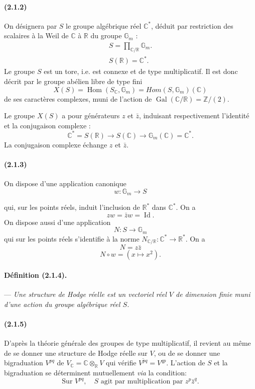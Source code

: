 \documentclass[10pt]{article}
\newcommand{\C}{\mathbb C}
\newcommand{\Z}{\mathbb Z}
\newcommand{\Hom}{\operatorname{Hom}}
\newcommand{\R}{\mathbb R}
\newcommand{\Gm}{\mathbb G_m}
\newcommand{\Gal}{\operatorname{Gal}}
\begin{document}
\paragraph{(2.1.2)} On désignera par $S$ le groupe algébrique réel $\C^*$, déduit par restriction des scalaires à la Weil de $\C$ à $\R$ du groupe $\Gm$ :
\[
\begin{gathered}
S=\prod_{\C/\R}\Gm.\\
S(\R)=\C^*.
\end{gathered}
\]
Le groupe $S$ est un tore, i.e. est connexe et de type multiplicatif. Il est donc décrit par le groupe abélien libre de type fini
\[
X(S)=\Hom(S_\C,\Gm)=\mathit{Hom}(S,\Gm)(\C)
\]
de ses caractères complexes, muni de l'action de $\Gal(\C/\R)=\Z/(2)$.

Le groupe $X(S)$ a pour générateurs $z$ et $\bar z$, induisant respectivement l'identité et la conjugaison complexe :
\[
\C^*=S(\R)\longrightarrow S(\C)\longrightarrow \Gm(\C)=\C^*.
\]
La conjugaison complexe échange $z$ et $\bar z$.

\paragraph{(2.1.3)} On dispose d'une application canonique
\[
\tag{2.1.3.1}
w:\Gm\longrightarrow S
\]




qui, sur les points réels, induit l'inclusion de $\R^*$ dans $\C^*$. On a
\[
\tag{2.1.3.2}
z w=\bar z w=\operatorname{Id}.
\]
On dispose aussi d'une application
\[
\tag{2.1.3.3}
N:S\longrightarrow\Gm
\]
qui sur les points réels s'identifie à la norme $N_{\C/\R}:\C^*\to\R^*$. On a
\[
\tag{2.1.3.4}
N=z\bar z
\]
\[
\tag{2.1.3.5}
N\circ w=(x\mapsto x^2).
\]

\paragraph{Définition (2.1.4).} --- \emph{Une structure de Hodge réelle est un vectoriel réel $V$ de dimension finie muni d'une action du groupe algébrique réel $S$.}

\paragraph{(2.1.5)} D'après la théorie générale des groupes de type multiplicatif, il revient au même de se donner une structure de Hodge réelle sur $V$, ou de se donner une bigraduation $V^{pq}$ de $V_\C=\C\otimes_\R V$ qui vérifie $\overline{V^{pq}}=V^{qp}$. L'action de $S$ et la bigraduation se déterminent mutuellement \emph{via} la condition:
\[
\tag{2.1.5.1}
\text{Sur }V^{pq},\quad S\text{ agit par multiplication par }z^p\bar z^q.
\]
\end{document}
